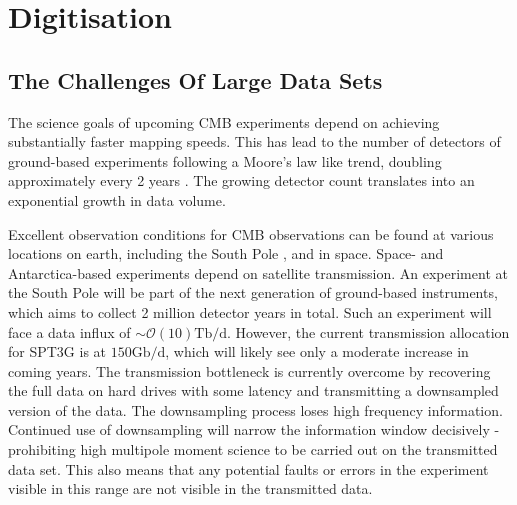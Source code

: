 \documentclass[apj]{emulateapj}
\begin{document}






\section{Digitisation}
\label{sec:dig}

\subsection{The Challenges Of Large Data Sets}
\label{subsec:problem}


The science goals of upcoming CMB experiments depend on achieving substantially faster mapping speeds. This has lead to the number of detectors of ground-based experiments following a Moore's law like trend, doubling approximately every 2 years \citep{s4sciencebook, Abazajian2015}. The growing detector count translates into an exponential growth in data volume.

Excellent observation conditions for CMB observations can be found at various locations on earth, including the South Pole \citep{kovac2007}, and in space. Space- and Antarctica-based experiments depend on satellite transmission. An experiment at the South Pole will be part of the next generation of ground-based instruments, which aims to collect 2 million detector years in total. Such an experiment will face a data influx of $\sim \mathcal{O}(10)\mathrm{Tb/d}$. However, the current transmission allocation for SPT3G is at $150\mathrm{Gb/d}$, which will likely see only a moderate increase in coming years. The transmission bottleneck is currently overcome by recovering the full data on hard drives with some latency and transmitting a downsampled version of the data. The downsampling process loses high frequency information. Continued use of downsampling will narrow the information window decisively - prohibiting high multipole moment science to be carried out on the transmitted data set. This also means that any potential faults or errors in the experiment visible in this range are not visible in the transmitted data. %
\end{document}

